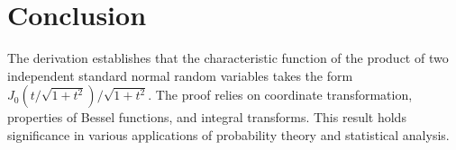 \documentclass{article}
\begin{document}
\section{Conclusion}

The derivation establishes that the characteristic function of the product of
two independent standard normal random variables takes the form $J_0  (t /
\sqrt{1 + t^2}) / \sqrt{1 + t^2}$. The proof relies on coordinate
transformation, properties of Bessel functions, and integral transforms. This
result holds significance in various applications of probability theory and
statistical analysis.
\end{document}
